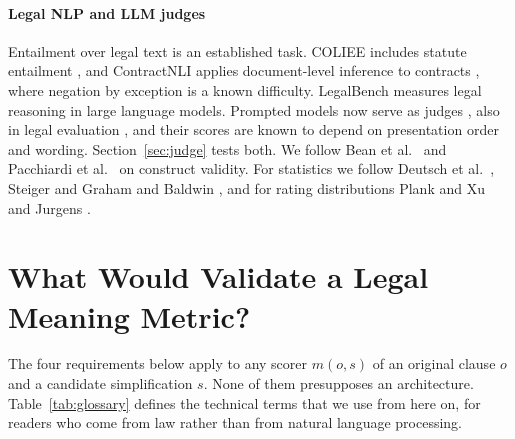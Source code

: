 \documentclass{BVP_JCLLT}
\newcommand{\rev}[1]{#1}
\newcommand{\rev}[1]{{\color{revcol}#1}}
\begin{document}
{\paragraph{Legal NLP and LLM judges}
Entailment over legal text is an established task. COLIEE includes statute
entailment \cite{goebel2024coliee}, and ContractNLI applies document-level
inference to contracts \cite{koreeda2021contractnli}, where negation by exception
is a known difficulty. LegalBench \cite{guha2023legalbench} measures legal
reasoning in large language models. Prompted models now serve as judges
\cite{zheng2023judging}, also in legal evaluation \cite{enguehard2025lemaj}, and
their scores are known to depend on presentation order and wording.
Section~\ref{sec:judge} tests both. We follow Bean et al.\
\cite{bean2025construct} and Pacchiardi et al.\ \cite{pacchiardi2024cleverhans}
on construct validity. For statistics we follow Deutsch et al.\
\cite{deutsch2021statistical}, Steiger \cite{steiger1980tests} and Graham and
Baldwin \cite{graham2014williams}, and for rating distributions Plank
\cite{plank2022variation} and Xu and Jurgens \cite{xu2026disagreement}.}

\section{What Would Validate a Legal Meaning Metric?}\label{sec:protocol}

\rev{The four requirements below apply to any scorer $m(o,s)$ of an original
clause $o$ and a candidate simplification $s$. None of them presupposes an
architecture. Table~\ref{tab:glossary} defines the technical terms that we use
from here on, for readers who come from law rather than from natural language
processing.}

\begin{table}
\centering
\caption{\rev{Terms used in this article.}}\label{tab:glossary}
\small
\rev{}
\end{table}
\end{document}
